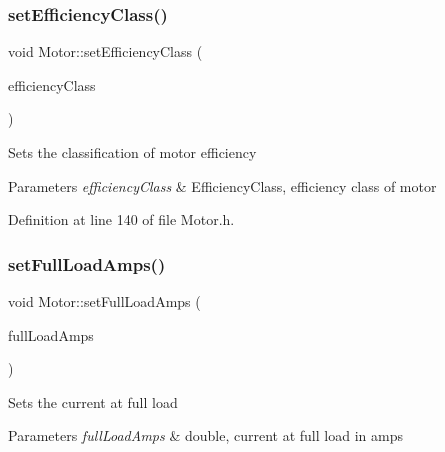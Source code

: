\mbox{\label{class_motor_afa82df266d74ccfed49bf592b5b6526f}} 
\subsubsection{\texorpdfstring{set\+Efficiency\+Class()}{setEfficiencyClass()}}
{\footnotesize\ttfamily void Motor\+::set\+Efficiency\+Class (\begin{DoxyParamCaption}\item[{\hyperlink{class_motor_afa022971ae062406a9f588c601673d4e}{Efficiency\+Class}}]{efficiency\+Class }\end{DoxyParamCaption})\hspace{0.3cm}{\ttfamily [inline]}}

Sets the classification of motor efficiency


\begin{DoxyParams}{Parameters}
{\em efficiency\+Class} & Efficiency\+Class, efficiency class of motor \\
\hline
\end{DoxyParams}


Definition at line 140 of file Motor.\+h.

\mbox{\label{class_motor_a4bc8bf85c7749a0b7ff279d7eef20a2e}} 
\subsubsection{\texorpdfstring{set\+Full\+Load\+Amps()}{setFullLoadAmps()}}
{\footnotesize\ttfamily void Motor\+::set\+Full\+Load\+Amps (\begin{DoxyParamCaption}\item[{double}]{full\+Load\+Amps }\end{DoxyParamCaption})\hspace{0.3cm}{\ttfamily [inline]}}

Sets the current at full load


\begin{DoxyParams}{Parameters}
{\em full\+Load\+Amps} & double, current at full load in amps \\
\hline
\end{DoxyParams}


